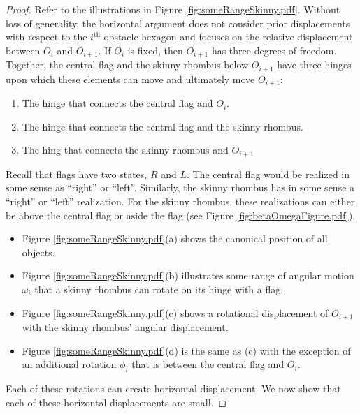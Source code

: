 \documentclass[10pt]{CSUNthesis}
\theoremstyle{plain}%
\theoremstyle{definition}
\theoremstyle{remark}
\newcommand{\ith}{i^\text{th}}
\begin{document}
\begin{proof}
Refer to the illustrations in Figure \ref{fig:someRangeSkinny.pdf}.  
Without loss of generality, the horizontal argument does not consider prior displacements with respect to the $\ith$ obstacle hexagon and focuses on the relative displacement between $O_{i}$ and $O_{i+1}$.  
If $O_i$ is fixed, then $O_{i+1}$ has three degrees of freedom.  
Together, the central flag and the skinny rhombus below $O_{i+1}$ have three hinges upon which these elements can move and ultimately move $O_{i+1}$:
\begin{enumerate}
\item The hinge that connects the central flag and $O_i$.
\item The hinge that connects the central flag and the skinny rhombus.
\item The hing that connects the skinny rhombus and $O_{i+1}$
\end{enumerate}
Recall that flags have two states, $R$ and $L$.  
The central flag would be realized in some sense as ``right'' or ``left''.   
Similarly, the skinny rhombus has in some sense a ``right'' or ``left'' realization.  
For the skinny rhombus, these realizations can either be above the central flag  or aside the flag (see Figure \ref{fig:betaOmegaFigure.pdf}).  
\begin{itemize}
\item Figure \ref{fig:someRangeSkinny.pdf}(a) shows the canonical position of all objects.  
\item Figure \ref{fig:someRangeSkinny.pdf}(b) illustrates some range of angular motion $\omega_i$ that a skinny rhombus can rotate on its hinge with a flag.  
\item Figure \ref{fig:someRangeSkinny.pdf}(c) shows a rotational displacement of $O_{i+1}$ with the skinny rhombus' angular displacement.
\item Figure \ref{fig:someRangeSkinny.pdf}(d) is the same as (c) with the exception of an additional rotation $\phi_i$ that is between the central flag and $O_i$.   
\end{itemize}
Each of these rotations can create horizontal displacement.  
We now show that each of these horizontal displacements are small.


\end{proof}
\end{document}
